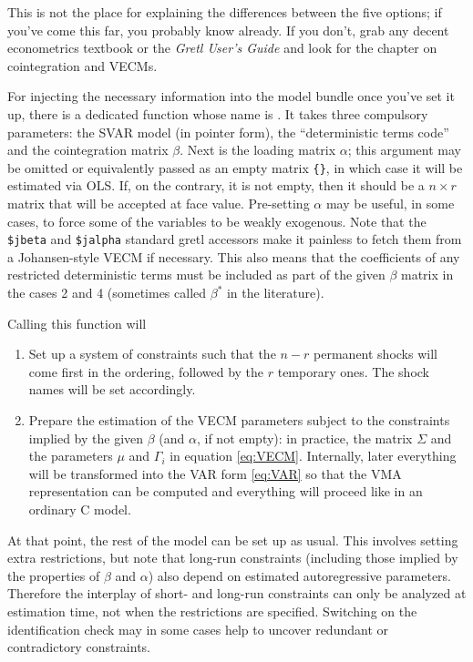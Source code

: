 \documentclass[a4paper,10pt]{article}
\newcommand{\dtk}[1]{\texttt{\detokenize{#1}}}
\begin{document}
This is not the place for explaining the differences between the five
options; if you've come this far, you probably know already. If you
don't, grab any decent econometrics textbook or the \emph{Gretl User's
  Guide} and look for the chapter on cointegration and VECMs.

For injecting the necessary information into the model bundle once
you've set it up, there is a dedicated function whose name is
\dtk{SVAR_coint}. It takes three compulsory parameters: the SVAR
model (in pointer form), the ``deterministic terms code'' and the
cointegration matrix $\beta$. 
Next is the loading matrix $\alpha$; this argument may be omitted or 
equivalently passed as an empty matrix \texttt{\{\}}, in which case
it will be estimated via OLS. If, on the contrary, it is not empty,
then it should be a $n \times r$ matrix that will be accepted at face
value. Pre-setting $\alpha$ may be useful, in some cases, to force
some of the variables to be weakly exogenous. Note that the
\verb!$jbeta!  and \verb|$jalpha| standard gretl accessors make it
painless to fetch them from a Johansen-style VECM if necessary. 
This also means that the coefficients of any restricted deterministic 
terms must be included as part of the given $\beta$ matrix in the 
cases 2 and 4 (sometimes called $\beta^*$ in the literature).

Calling this function will
\begin{enumerate}
\item Set up a system of constraints such that the $n-r$ permanent
  shocks will come first in the ordering, followed by the $r$
  temporary ones. The shock names will be set accordingly.
\item Prepare the estimation of the VECM parameters subject to the constraints 
  implied by the given $\beta$ (and $\alpha$, if not empty): in practice, the
  matrix $\Sigma$ and the parameters $\mu$ and $\Gamma_i$ in equation
  \eqref{eq:VECM}. Internally, later everything will be transformed into 
  the VAR form \eqref{eq:VAR} so that the VMA representation can be computed 
  and everything will proceed like in an ordinary C model.
\end{enumerate}

At that point, the rest of the model can be set up as usual. This involves 
setting extra restrictions, but note that long-run constraints (including 
those implied by the properties of $\beta$ and $\alpha$) also depend on 
estimated autoregressive parameters. Therefore the interplay of short- and
long-run constraints can only be analyzed at estimation time, not when the 
restrictions are specified. Switching on the identification check may in some
cases help to uncover redundant or contradictory constraints.
\end{document}
